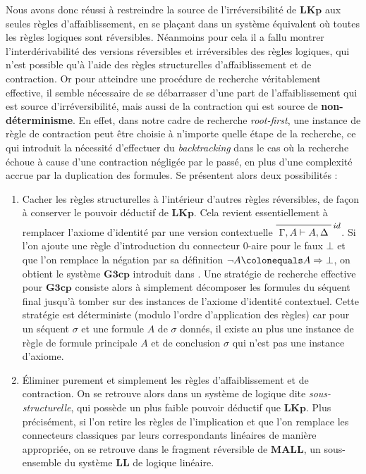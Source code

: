 \documentclass[12pt]{report}
\newcommand{\lto}{\Rightarrow}
\newcommand{\seq}{\vdash}
\newcommand{\irule}[1]{\footnotesize$#1$}
\begin{document}
Nous avons donc réussi à restreindre la source de l'irréversibilité de $\mathbf{LKp}$ aux seules règles d'affaiblissement, en se plaçant dans un système équivalent où toutes les règles logiques sont réversibles. Néanmoins pour cela il a fallu montrer l'interdérivabilité des versions réversibles et irréversibles des règles logiques, qui n'est possible qu'à l'aide des règles structurelles d'affaiblissement et de contraction. Or pour atteindre une procédure de recherche véritablement effective, il semble nécessaire de se débarrasser d'une part de l'affaiblissement qui est source d'irréversibilité, mais aussi de la contraction qui est source de \textbf{non-déterminisme}. En effet, dans notre cadre de recherche \textit{root-first}, une instance de règle de contraction peut être choisie à n'importe quelle étape de la recherche, ce qui introduit la nécessité d'effectuer du \textit{backtracking} dans le cas où la recherche échoue à cause d'une contraction négligée par le passé, en plus d'une complexité accrue par la duplication des formules. Se présentent alors deux possibilités :
\begin{enumerate}
	\item Cacher les règles structurelles à l'intérieur d'autres règles réversibles, de façon à conserver le pouvoir déductif de $\mathbf{LKp}$. Cela revient essentiellement à remplacer l'axiome d'identité par une version contextuelle $\prfbyaxiom{\irule{id}}{\Gamma,A \seq A,\Delta}$. Si l'on ajoute une règle d'introduction du connecteur 0-aire pour le faux $\bot$ et que l'on remplace la négation par sa définition $\neg A \colonequals A \lto \bot$, on obtient le système $\mathbf{G3cp}$ introduit dans \cite{vPN01}. Une stratégie de recherche effective pour $\mathbf{G3cp}$ consiste alors à simplement décomposer les formules du séquent final jusqu'à tomber sur des instances de l'axiome d'identité contextuel. Cette stratégie est déterministe (modulo l'ordre d'application des règles) car pour un séquent $\sigma$ et une formule $A$ de $\sigma$ donnés, il existe au plus une instance de règle de formule principale $A$ et de conclusion $\sigma$ qui n'est pas une instance d'axiome.
    \item Éliminer purement et simplement les règles d'affaiblissement et de contraction. On se retrouve alors dans un système de logique dite \emph{sous-structurelle}, qui possède un plus faible pouvoir déductif que $\mathbf{LKp}$. Plus précisément, si l'on retire les règles de l'implication et que l'on remplace les connecteurs classiques par leurs correspondants linéaires de manière appropriée, on se retrouve dans le fragment réversible de $\mathbf{MALL}$, un sous-ensemble du système $\mathbf{LL}$ de logique linéaire.
\end{enumerate}
\end{document}
